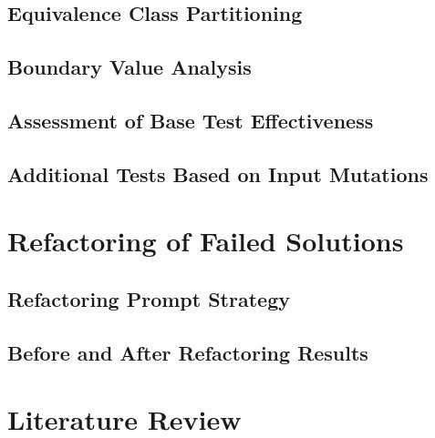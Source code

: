 \documentclass[journal]{IEEEtran}
\begin{document}
\subsection{Equivalence Class Partitioning}

\subsection{Boundary Value Analysis}

\subsection{Assessment of Base Test Effectiveness}

\subsection{Additional Tests Based on Input Mutations}

\section{Refactoring of Failed Solutions}

\subsection{Refactoring Prompt Strategy}

\subsection{Before and After Refactoring Results}

\section{Literature Review}
\end{document}
